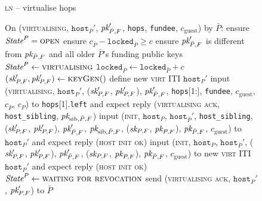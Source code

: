 \begin{figure}[H]
  \begin{processbox}{\textsc{ln} -- virtualise hops}
    \begin{algorithmic}[1]
      \State On (\textsc{virtualising}, $\texttt{host}_{\bar{P}}'$,
      $\textit{pk}_{\bar{P}, F}'$, \texttt{hops}, \texttt{fundee}, $c_{\mathrm{guest}}$)
      by $\bar{P}$:
      \Indent
        \State ensure $\textit{State}^P = \textsc{open}$
        \State ensure $c_{\bar{P}} - \texttt{locked}_{\bar{P}} \geq c$
        \State ensure $\textit{pk}_{\bar{P}, F}'$ is different from $\textit{pk}_{\bar{P}, F}$ and
        all older $\bar{P}$'s funding public keys
        \State $\textit{State}^P \gets \textsc{virtualising}$
        \State $\texttt{locked}_{\bar{P}} \gets \texttt{locked}_{\bar{P}} + c$
        \State $(\textit{sk}_{P, F}', \textit{pk}_{P, F}') \gets \textsc{keyGen}()$
         
          \State define new \textsc{virt} ITI $\texttt{host}_P'$
          \State input (\textsc{virtualising}, $\texttt{host}_P'$, ($\textit{sk}_{P,
          F}'$, $\textit{pk}_{P, F}'$), $\textit{pk}_{\bar{P}, F}'$, \texttt{hops}[1:],
          \texttt{fundee}, $c_{\mathrm{guest}}$, $c_{\bar{P}}$, $c_P$) to
          \texttt{hops}[1].\texttt{left} and expect reply (\textsc{virtualising
          ack}, \texttt{host\_sibling}, $\textit{pk}_{\mathrm{sib}, \bar{P}, F}$)
          \State input (\textsc{init}, $\texttt{host}_P$,
          $\texttt{host}_{\bar{P}}'$, \texttt{host\_sibling}, ($\textit{sk}_{P, F}'$,
          $\textit{pk}_{P, F}'$), $\textit{pk}_{\bar{P}, F}'$, $\textit{pk}_{\mathrm{sib}, \bar{P}, F}$,
          ($\textit{sk}_{P, F}$, $\textit{pk}_{P, F}$), $\textit{pk}_{\bar{P}, F}$, $c_{\mathrm{guest}}$)
          to $\texttt{host}_P'$ and expect reply (\textsc{host init ok})
        \Else \: 
          \State input (\textsc{init}, $\texttt{host}_P$,
          $\texttt{host}_{\bar{P}}'$, ($\textit{sk}_{P, F}'$, $\textit{pk}_{P, F}'$),
          $\textit{pk}_{\bar{P}, F}'$, ($\textit{sk}_{P, F}$, $\textit{pk}_{P, F}$), $\textit{pk}_{\bar{P}, F}$,
          $c_{\mathrm{guest}}$) to new \textsc{virt} ITI $\texttt{host}_P'$ and
          expect reply (\textsc{host init ok})
        \EndIf
        \State $\textit{State}^P \gets \textsc{waiting for revocation}$
        \State send (\textsc{virtualising ack}, $\texttt{host}_P'$, $\textit{pk}_{P, F}'$)
        to $\bar{P}$
      \EndIndent
      \Statex


\end{algorithmic}
\end{processbox}
\end{figure}

